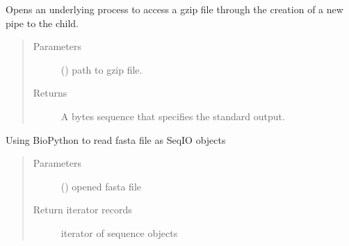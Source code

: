 \documentclass[letterpaper,10pt,english]{sphinxmanual}
\begin{document}
\begin{fulllineitems}
\label{\detokenize{_autosummary/graphdb_builder:graphdb_builder.builder_utils.read_gzipped_file}}
Opens an underlying process to access a gzip file through the creation of a new pipe to the child.
\begin{quote}\begin{description}
\item[{Parameters}] \leavevmode
{} () \textendash{} path to gzip file.

\item[{Returns}] \leavevmode
A bytes sequence that specifies the standard output.

\end{description}\end{quote}

\end{fulllineitems}


\begin{fulllineitems}
\label{\detokenize{_autosummary/graphdb_builder:graphdb_builder.builder_utils.parse_fasta}}
Using BioPython to read fasta file as SeqIO objects
\begin{quote}\begin{description}
\item[{Parameters}] \leavevmode
{} () \textendash{} opened fasta file

\item[{Return iterator records}] \leavevmode
iterator of sequence objects

\end{description}\end{quote}

\end{fulllineitems}
\end{document}
